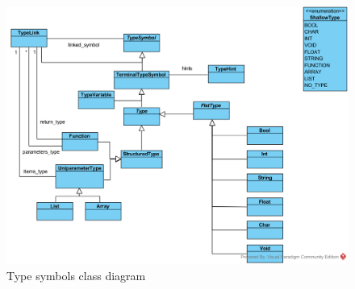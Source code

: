 \documentclass[a4paper,11pt]{article}
\begin{document}
\begin{figure}[h]
	\center
	\includegraphics[scale=0.75]{type_symbols.png}
	\caption{Type symbols class diagram}
	\label{fig:}
\end{figure}
\end{document}
